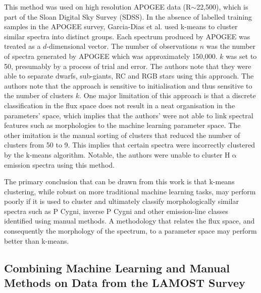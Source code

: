 This method was used on high resolution APOGEE data (R$\sim$22,500), which is part of the Sloan Digital Sky Survey (SDSS)\cite{eisenstein2001spectroscopic}\cite{blanton2017sloan}. In the absence of labelled training samples in the APOGEE survey, Garcia-Dias et al. used k-means to cluster similar spectra into distinct groups\cite{garcia2018machine}. Each spectrum produced by APOGEE was treated as a $d$-dimensional vector. The number of observations $n$ was the number of spectra generated by APOGEE which was approximately 150,000. $k$ was set to 50, presumably by a process of trial and error. The authors note that they were able to separate dwarfs, sub-giants, RC and RGB stars using this approach. The authors note that the approach is sensitive to initialisation and thus sensitive to the number of clusters $k$. One major limitation of this approach is that a discrete classification in the flux space does not result in a neat organisation in the parameters' space, which implies that the authors' were not able to link spectral features such as morphologies to the machine learning parameter space. The other imitation is the manual sorting of clusters that reduced the number of clusters from 50 to 9. This implies that certain spectra were incorrectly clustered by the k-means algorithm. Notable, the authors were unable to cluster H$\upalpha$ emission spectra using this method. 

The primary conclusion that can be drawn from this work is that k-means clustering, while robust on more traditional machine learning tasks, may perform poorly if it is used to cluster and ultimately classify morphologically similar spectra such as P Cygni, inverse P Cygni and other emission-line classes identified using manual methods. A methodology that relates the flux space, and consequently the morphology of the spectrum, to a parameter space may perform better than k-means. 

\subsection{Combining Machine Learning and Manual Methods on Data from the LAMOST Survey}

